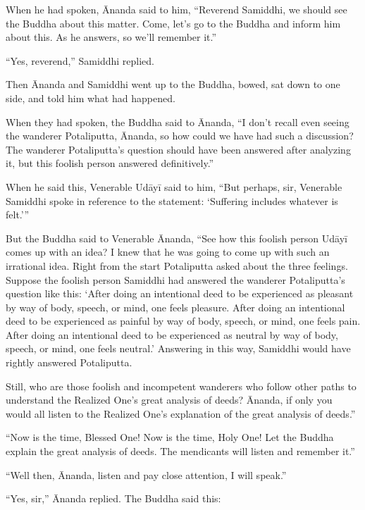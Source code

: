 \documentclass[12pt,openany]{book}%
\begin{document}
When he had spoken, Ānanda said to him, “Reverend Samiddhi, we should see the Buddha about this matter. Come, let’s go to the Buddha and inform him about this. As he answers, so we’ll remember it.” 

“Yes, reverend,” Samiddhi replied. 

Then Ānanda and Samiddhi went up to the Buddha, bowed, sat down to one side, and told him what had happened. 

When they had spoken, the Buddha said to Ānanda, “I don’t recall even seeing the wanderer Potaliputta, Ānanda, so how could we have had such a discussion? The wanderer Potaliputta’s question should have been answered after analyzing it, but this foolish person answered definitively.” 

When he said this, Venerable \textsanskrit{Udāyī} said to him, “But perhaps, sir, Venerable Samiddhi spoke in reference to the statement: ‘Suffering includes whatever is felt.’” 

But the Buddha said to Venerable Ānanda, “See how this foolish person \textsanskrit{Udāyī} comes up with an idea? I knew that he was going to come up with such an irrational idea. Right from the start Potaliputta asked about the three feelings. Suppose the foolish person Samiddhi had answered the wanderer Potaliputta’s question like this: ‘After doing an intentional deed to be experienced as pleasant by way of body, speech, or mind, one feels pleasure. After doing an intentional deed to be experienced as painful by way of body, speech, or mind, one feels pain. After doing an intentional deed to be experienced as neutral by way of body, speech, or mind, one feels neutral.’ Answering in this way, Samiddhi would have rightly answered Potaliputta. 

Still, who are those foolish and incompetent wanderers who follow other paths to understand the Realized One’s great analysis of deeds? Ānanda, if only you would all listen to the Realized One’s explanation of the great analysis of deeds.” 

“Now is the time, Blessed One! Now is the time, Holy One! Let the Buddha explain the great analysis of deeds. The mendicants will listen and remember it.” 

“Well then, Ānanda, listen and pay close attention, I will speak.” 

“Yes, sir,” Ānanda replied. The Buddha said this: 
\end{document}
